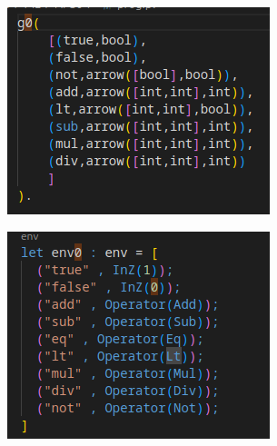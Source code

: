 \documentclass{article}
\begin{document}
\begin{itemize}
		\begin{figure}[H]
		\centering
		\begin{subfigure}{0.45\textwidth}
			\centering
			\includegraphics[width=\textwidth]{./images/typage1.png} 
			\label{fig:sub1}
		\end{subfigure}
		\hfill
		\begin{subfigure}{0.45\textwidth}
			\centering
			\includegraphics[width=\textwidth]{./images/eval1.png} 
			\label{fig:sub2}
		\end{subfigure}
		\label{fig:images}
		\end{figure}
	

\end{itemize}
\end{document}
